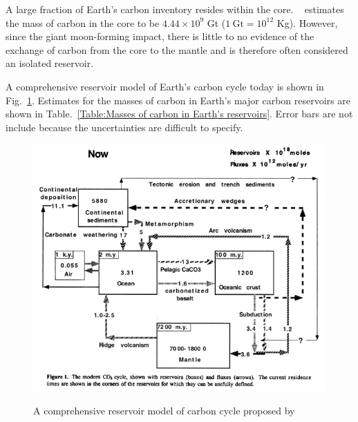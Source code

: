 A large fraction of Earth's carbon inventory resides within the core. ~\cite{DR-CH-SN:2013} estimates the mass of carbon in the core to be $4.44 \times 10^9$ Gt ($1~\text{Gt} = 10^{12}$ Kg). However, since the giant moon-forming impact, there is little to no evidence of the exchange of carbon from the core to the mantle and is therefore often considered an isolated reservoir. 

A comprehensive reservoir model of Earth's carbon cycle today is shown in Fig.~\ref{FIG:SNHZKBoxModelDiagram}. Estimates for the masses of carbon in Earth's major carbon reservoirs are shown in Table.~\ref{Table:Masses of carbon in Earth's reservoirs}. Error bars are not include because the uncertainties are difficult to specify.

\begin{figure}[h!]
  \centering
  \includegraphics[scale=0.5]{Figures/SNH-ZK-2001_BoxModelDiagram.png}
  \label{FIG:SNHZKBoxModelDiagram}
  \caption{A comprehensive reservoir model of carbon cycle proposed by ~\citet{SNH-ZK:2001}}
\end{figure}






